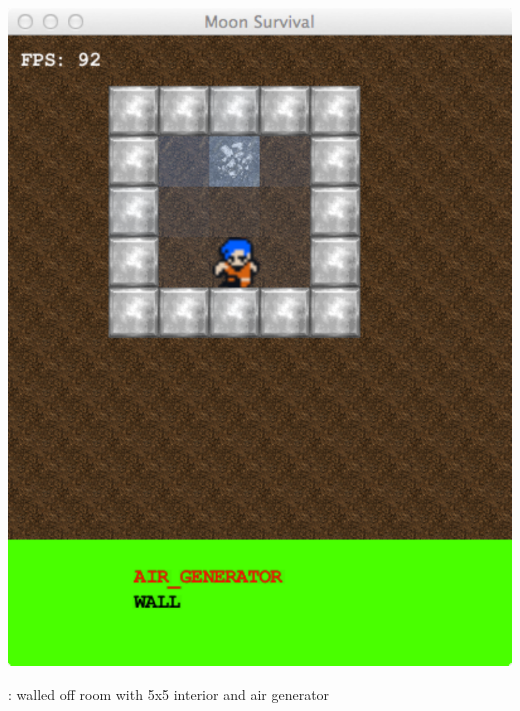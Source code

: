 \begin{marginfigure}
	\includegraphics{res/space_base_prototype/room_with_air_generator.pdf}
	\caption{
	\prototypeSiddall : walled off room with 5x5 interior and air generator	}
	\label{fig:SpaceBaseWithAirGenerator}
\end{marginfigure}

